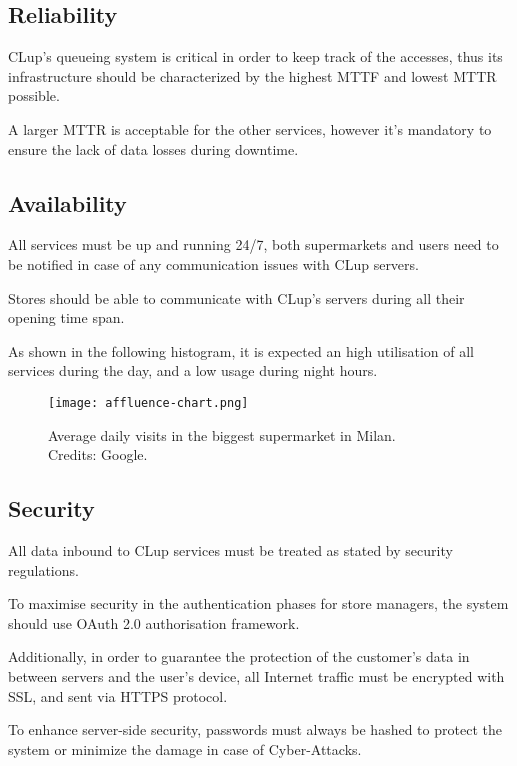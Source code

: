 \documentclass[../../main.tex]{subfiles}
\begin{document}
	\subsection{Reliability}

	CLup's queueing system is critical in order to keep track of the accesses, thus its infrastructure 
	should be characterized by the highest MTTF and lowest MTTR possible.

	A larger MTTR is acceptable for the other services, however it's mandatory to ensure the lack of 
	data losses during downtime.

	\subsection{Availability}

	All services must be up and running 24/7, both supermarkets and users need to be notified in case of 
	any communication issues with CLup servers.

	Stores should be able to communicate with CLup's servers during all their opening time span.

	As shown in the following histogram, it is expected an high utilisation of all services during the day, 
	and a low usage during night hours.

	\begin{figure}[h!]
	    \centering
	    \texttt{[image: affluence-chart.png]}
	    \caption{Average daily visits in the biggest supermarket in Milan. \\Credits: Google.}
  	\end{figure}

	\subsection{Security}

	All data inbound to CLup services must be treated as stated by security regulations. 

	To maximise security in the authentication phases for store managers, the system should use 
	OAuth 2.0 authorisation framework.

	Additionally, in order to guarantee the protection of the customer's data in between servers and the 
	user's device, all Internet traffic must be encrypted with SSL, and sent via HTTPS protocol.

	To enhance server-side security, passwords must always be hashed to protect the system or minimize the damage 
	in case of Cyber-Attacks. 
\end{document}
